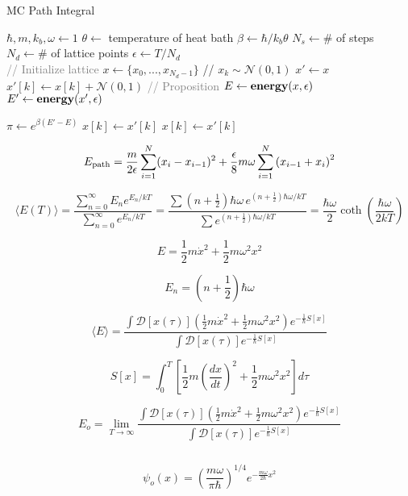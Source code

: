 \documentclass{article}
\begin{document}
\begin{algorithm}
\caption{MC Path Integral}\label{euclid}
\begin{algorithmic}[1]
	\State $\hbar, m, k_b, \omega \gets 1$
	\State $\theta \gets$ temperature of heat bath
	\State $\beta \gets \hbar/k_b\theta$
	\State $N_s \gets \#$ of steps
	\State $N_d \gets \#$ of lattice points 
	\State $\epsilon \gets T/N_d$ \\

	\State \textcolor{gray}{// Initialize lattice}
	\State $x \gets \{x_0, ..., x_{N_d - 1}\}$ // $x_k \sim \mathcal{N}(0,1)$
	\State $x' \gets x$ \\

			\State $x'[k] \gets x[k] + \mathcal{N}(0,1)$ \textcolor{gray}{// Proposition}
			\State $E \gets {\rm \textbf{energy}}(x, \epsilon)$
			\State $E' \gets {\rm \textbf{energy}}(x', \epsilon)$

			\State $\pi \gets e^{\beta (E'-E)}$
				\State $x[k] \gets x'[k]$
			\Else 
					\State $x[k] \gets x'[k]$
				\EndIf
			\EndIf 
		\EndFor
	\EndFor
	\EndProcedure
\end{algorithmic}
\end{algorithm}

\Large
\[E_{\rm path} = \frac{m}{2\epsilon} \sum^{N}_{i=1}(x_i - x_{i-1})^{2} + \frac{\epsilon}{8} m \omega \sum^{N}_{i=1} \left(x_{i-1} + x_i\right)^{2} \]

\[\langle E(T) \rangle = \frac{\sum\limits_{n=0}^{\infty} E_n e^{E_n/kT}}{\sum\limits_{n=0}^{\infty} e^{E_n/kT}}
	= \frac{\sum (n+\frac{1}{2})\hbar\omega \, e^{(n+\frac{1}{2})\hbar\omega/kT}}{\sum e^{(n+\frac{1}{2})\hbar\omega/kT}} = \frac{\hbar \omega}{2} \coth\left(\frac{\hbar\omega}{2 k T}\right) \]

\Huge
\[E = \frac{1}{2}m\dot{x}^2 + \frac{1}{2}m\omega^2x^2 \]

\[E_n = \left(n + \frac{1}{2}\right) \hbar\omega \] 
\[\]

\Large
\[\langle E \rangle = \frac{\int \mathcal{D}[x(\tau)] \left(\frac{1}{2}m\dot{x}^2 + \frac{1}{2}m\omega^2 x^2 \right) e^{-\frac{1}{\hbar}S[x]}}{\int \mathcal{D}[x(\tau)] e^{-\frac{1}{\hbar}S[x]}} \]

\[\]
\[S[x] = \int^T_0 \left[\frac{1}{2}m\left(\frac{dx}{dt}\right)^2 + \frac{1}{2}m\omega^2 x^2 \right] d\tau \]

\[E_o = \lim_{T\rightarrow \infty} \frac{\int \mathcal{D}[x(\tau)] \left(\frac{1}{2}m\dot{x}^2 + \frac{1}{2}m\omega^2 x^2 \right) e^{-\frac{1}{\hbar}S[x]}}{\int \mathcal{D}[x(\tau)] e^{-\frac{1}{\hbar}S[x]}} \]

\[\]

\[\psi_o(x) = \left(\frac{m\omega}{\pi \hbar}\right)^{1/4} e^{-\frac{m\omega}{2\hbar}x^2} \]
\end{document}
